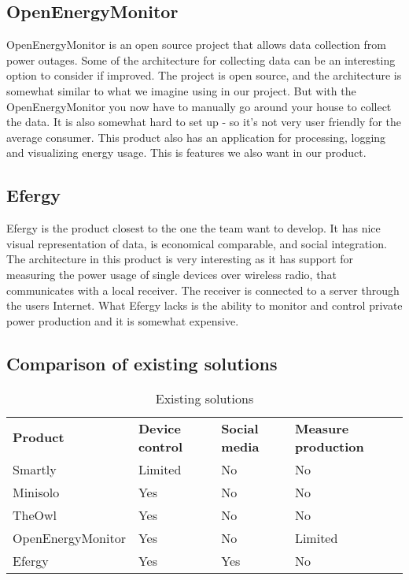 \subsection{OpenEnergyMonitor}

OpenEnergyMonitor\cite{openenergymonitor} is an open source project that allows data collection from power outages. Some of the architecture for collecting data can be an interesting option to consider if improved. The project is open source, and the architecture is somewhat similar to what we imagine using in our project. But with the OpenEnergyMonitor you now have to manually go around your house to collect the data. It is also somewhat hard to set up - so it’s not very user friendly for the average consumer.  This product also has an application for processing, logging and visualizing energy usage. This is features we also want in our product. 



\subsection{Efergy}

Efergy\cite{efergy} is the product closest to the one the team want to develop. It has nice visual representation of data, is economical comparable, and social integration. The architecture in this product is very interesting as it has support for measuring the power usage of single devices over wireless radio, that communicates with a local receiver. The receiver is connected to a server through the users Internet. What Efergy lacks is the ability to monitor and control private power production and it is somewhat expensive.


\subsection{Comparison of existing solutions}

\begin{table}[H]
\centering
{}
\begin{tabular}{|l|l|l|l|}
\hline
\textbf{Product} & \textbf{Device control} & \textbf{Social media} & \textbf{Measure production}\\
Smartly & Limited & No  & No \\
Minisolo & Yes & No  & No \\
TheOwl & Yes & No & No \\
OpenEnergyMonitor & Yes & No  & Limited \\
Efergy & Yes & Yes &  No \\
\end{tabular}
\caption{Existing solutions}
\label{tab:existingSolutions}
\end{table}
